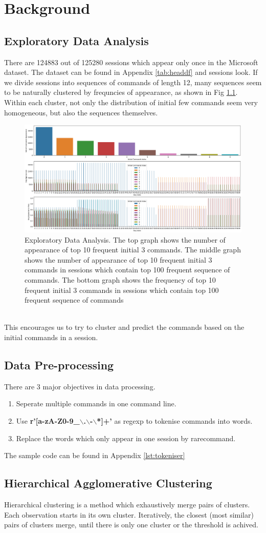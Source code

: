 \chapter{Background}

\section{Exploratory Data Analysis}
There are 124883 out of 125280 sessions which appear only once in the Microsoft dataset.
The dataset can be found in Appendix \ref{tab:headdf} and sessions look.
If we divide sessions into sequences of commands of length 12\cite{sadique2021analysis},
many sequences seem to be naturally clustered by frequncies of appearance, as shown in Fig \ref{fig:EDA}.
Within each cluster, not only the distribution of initial few commands seem very homogeneous,
but also the sequences themselves.
\begin{figure}[h]
    \centering
    \includegraphics[scale=0.3]{background/EDA.png}
    \caption{Exploratory Data Analysis. The top graph shows the number of appearance of 
    top 10 frequent initial 3 commands. The middle graph shows the number of appearance of 
    top 10 frequent initial 3 commands in sessions which contain top 100 frequent sequence of commands.
    The bottom graph shows the frequency of top 10 frequent 
    initial 3 commands in sessions which contain top 100 frequent sequence of commands}
    \label{fig:EDA}
\end{figure}
\\
This encourages us to try to cluster and predict the commands based on the initial commands in a session.
\section{Data Pre-processing}
There are 3 major objectives in data processing.
\begin{enumerate}
    \item Seperate multiple commands in one command line.
    \item Use \textbf{r'[a-zA-Z0-9\_$\backslash$.$\backslash$-$\backslash$*]+'} as regexp to tokenise commands into words.
    \item Replace the words which only appear in one session by rarecommand.
\end{enumerate}
The sample code can be found in Appendix \ref{lst:tokeniser}
\section{Hierarchical Agglomerative Clustering}
Hierarchical clustering is a method which exhaustively merge pairs of clusters.
Each observation starts in its own cluster. 
Iteratively, the closest (most similar) pairs of clusters merge, 
until there is only one cluster or the threshold is achived.